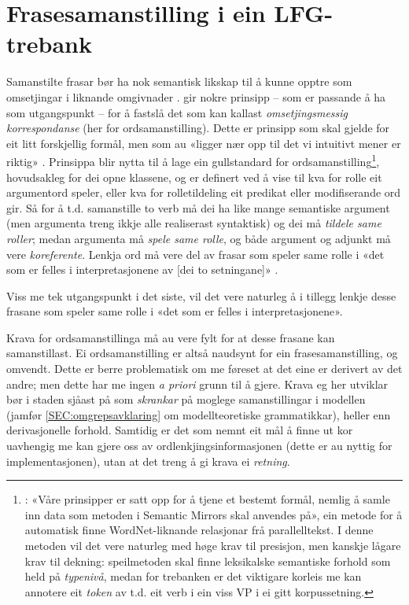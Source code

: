 \documentclass[11pt,a4paper,oneside,draft]{book}
\begin{document}
\section{Frasesamanstilling i ein LFG-trebank}
\label{sec-3.3}


Samanstilte frasar bør ha nok semantisk likskap til å kunne opptre som
omsetjingar i liknande omgivnader
\citep[s.~74]{dyvik2009lmp}. \citet{thunes2003eal} gir nokre prinsipp
-- som er passande å ha som utgangspunkt -- for å fastslå det som kan
kallast \emph{omsetjingsmessig korrespondanse} (her for
ordsamanstilling). Dette er prinsipp som skal gjelde for eit litt
forskjellig formål, men som au «ligger nær opp til det vi intuitivt
mener er riktig» \citep[s.~2]{thunes2003eal}. Prinsippa blir nytta til
å lage ein gullstandard for ordsamanstilling\footnote{\cite[s.~2]{thunes2003eal}: «Våre prinsipper er satt
       opp for å tjene et bestemt formål, nemlig å samle inn data som
       metoden i Semantic Mirrors skal anvendes på», ein metode for å
       automatisk finne WordNet-liknande relasjonar frå
       parallelltekst. I denne metoden vil det vere naturleg med høge
       krav til presisjon, men kanskje lågare krav til dekning:
       speilmetoden skal finne leksikalske semantiske forhold som held
       på \emph{typenivå}, medan for trebanken er det viktigare korleis me
       kan annotere eit \emph{token} av t.d. eit verb i ein viss VP i ei
       gitt korpussetning. },
hovudsakleg for dei opne klassene, og er definert ved å vise til kva
for rolle eit argumentord speler, eller kva for rolletildeling eit
predikat eller modifiserande ord gir. Så for å t.d. samanstille to
verb må dei ha like mange semantiske argument (men argumenta treng
ikkje alle realiserast syntaktisk) og dei må \emph{tildele same roller};
medan argumenta må \emph{spele same rolle}, og både argument og adjunkt må
vere \emph{koreferente}. Lenkja ord må vere del av frasar som speler same
rolle i «det som er felles i interpretasjonene av [dei to setningane]»
\citep[s.~3]{thunes2003eal}.


Viss me tek utgangspunkt i det siste, vil det vere naturleg å i
tillegg lenkje desse frasane som speler same rolle i «det som er
felles i interpretasjonene».

Krava for ordsamanstillinga må au vere fylt for at desse frasane kan
samanstillast. Ei ordsamanstilling er altså naudsynt for ein
frasesamanstilling, og omvendt. Dette er berre problematisk om me
føreset at det eine er derivert av det andre; men dette har me ingen
\emph{a priori} grunn til å gjere. Krava eg her utviklar bør i staden
sjåast på som \emph{skrankar} på moglege samanstillingar i modellen (jamfør
\ref{SEC:omgrepsavklaring} om modellteoretiske grammatikkar), heller
enn derivasjonelle forhold. Samtidig er det som nemnt eit mål å finne
ut kor uavhengig me kan gjere oss av ordlenkjingsinformasjonen (dette
er au nyttig for implementasjonen), utan at det treng å gi krava ei
\emph{retning}.
\end{document}

